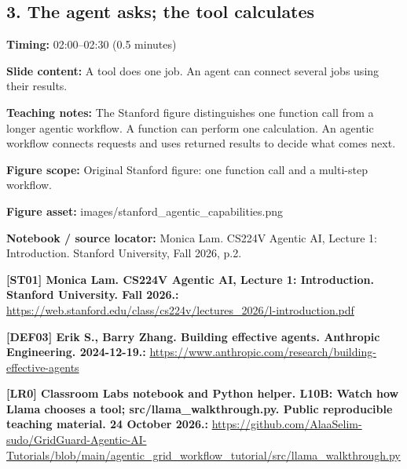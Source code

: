 \documentclass[10pt,letterpaper]{article}
\begin{document}
\subsection*{3. The agent asks; the tool calculates}
\textbf{Timing:} 02:00--02:30 (0.5 minutes)\par
\textbf{Slide content:} A tool does one job. An agent can connect several jobs using their results.\par
\textbf{Teaching notes:} The Stanford figure distinguishes one function call from a longer agentic workflow. A function can perform one calculation. An agentic workflow connects requests and uses returned results to decide what comes next.\par
\textbf{Figure scope:} Original Stanford figure: one function call and a multi-step workflow.\par
\textbf{Figure asset:} images/stanford\_agentic\_capabilities.png\par
\textbf{Notebook / source locator:} Monica Lam. CS224V Agentic AI, Lecture 1: Introduction. Stanford University, Fall 2026, p.2.\par
\textbf{[ST01] Monica Lam. CS224V Agentic AI, Lecture 1: Introduction. Stanford University. Fall 2026.:} \href{https://web.stanford.edu/class/cs224v/lectures_2026/l-introduction.pdf}{\small\ttfamily https:/\allowbreak{}/\allowbreak{}web.\allowbreak{}stanford.\allowbreak{}edu/\allowbreak{}class/\allowbreak{}cs224v/\allowbreak{}lectures\_\allowbreak{}2026/\allowbreak{}l-\allowbreak{}introduction.\allowbreak{}pdf}\par
\textbf{[DEF03] Erik S., Barry Zhang. Building effective agents. Anthropic Engineering. 2024-12-19.:} \href{https://www.anthropic.com/research/building-effective-agents}{\small\ttfamily https:/\allowbreak{}/\allowbreak{}www.\allowbreak{}anthropic.\allowbreak{}com/\allowbreak{}research/\allowbreak{}building-\allowbreak{}effective-\allowbreak{}agents}\par
\textbf{[LR0] Classroom Labs notebook and Python helper. L10B: Watch how Llama chooses a tool; src/llama\_walkthrough.py. Public reproducible teaching material. 24 October 2026.:} \href{https://github.com/AlaaSelim-sudo/GridGuard-Agentic-AI-Tutorials/blob/main/agentic_grid_workflow_tutorial/src/llama_walkthrough.py}{\small\ttfamily https:/\allowbreak{}/\allowbreak{}github.\allowbreak{}com/\allowbreak{}AlaaSelim-\allowbreak{}sudo/\allowbreak{}GridGuard-\allowbreak{}Agentic-\allowbreak{}AI-\allowbreak{}Tutorials/\allowbreak{}blob/\allowbreak{}main/\allowbreak{}agentic\_\allowbreak{}grid\_\allowbreak{}workflow\_\allowbreak{}tutorial/\allowbreak{}src/\allowbreak{}llama\_\allowbreak{}walkthrough.\allowbreak{}py}\par
\par\medskip
\end{document}
